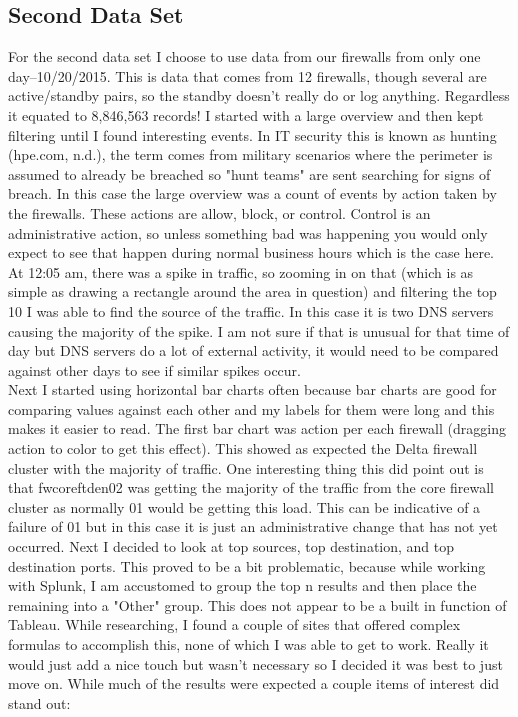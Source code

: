 \documentclass[10pt]{article}
\begin{document}
\subsection*{Second Data Set}
For the second data set I choose to use data from our firewalls from only one day--10/20/2015. This is data that comes from 12 firewalls, though several are active/standby pairs, so the standby doesn't really do or log anything. Regardless it equated to 8,846,563 records! I started with a large overview and then kept filtering until I found interesting events. In IT security this is known as hunting (hpe.com, n.d.), the term comes from military scenarios where the perimeter is assumed to already be breached so "hunt teams" are sent searching for signs of breach. In this case the large overview was a count of events by action taken by the firewalls. These actions are allow, block, or control. Control is an administrative action, so unless something bad was happening you would only expect to see that happen during normal business hours which is the case here. At 12:05 am, there was a spike in traffic, so zooming in on that (which is as simple as drawing a rectangle around the area in question) and filtering the top 10 I was able to find the source of the traffic. In this case it is two DNS servers causing the majority of the spike. I am not sure if that is unusual for that time of day but DNS servers do a lot of external activity, it would need to be compared against other days to see if similar spikes occur.\\
\indent Next I started using horizontal bar charts often because bar charts are good for comparing values against each other and my labels for them were long and this makes it easier to read. The first bar chart was action per each firewall (dragging action to color to get this effect). This showed as expected the Delta firewall cluster with the majority of traffic. One interesting thing this did point out is that fwcoreftden02 was getting the majority of the traffic from the core firewall cluster as normally 01 would be getting this load. This can be indicative of a failure of 01 but in this case it is just an administrative change that has not yet occurred. Next I decided to look at top sources, top destination, and top destination ports. This proved to be a bit problematic, because while working with Splunk, I am accustomed to group the top n results and then place the remaining into a "Other" group. This does not appear to be a built in function of Tableau. While researching, I found a couple of sites that offered complex formulas to accomplish this, none of which I was able to get to work. Really it would just add a nice touch but wasn't necessary so I decided it was best to just move on. While much of the results were expected a couple items of interest did stand out:
\end{document}
